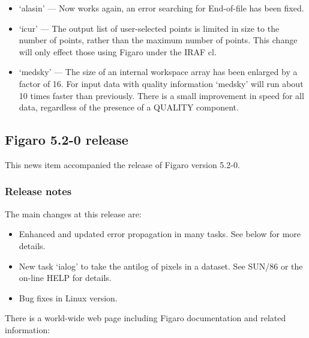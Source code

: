 \documentclass[11pt,twoside]{article}
\begin{document}
\begin{itemize}

\item `alasin' --- Now works again, an error searching for End-of-file
               has been fixed.

\item `icur'   --- The output list of user-selected points is limited in
               size to the number of points, rather than the maximum
               number of points.  This change will only effect those
               using Figaro under the IRAF cl.

\item `medsky' --- The size of an internal workspace array has been
               enlarged by a factor of 16.  For input data with
               quality information `medsky' will run about 10 times
               faster than previously.  There is a small improvement
               in speed for all data, regardless of the presence
               of a QUALITY component.

\end{itemize}


\subsection{\label{news520}Figaro 5.2-0 release}

 This news item accompanied the release of Figaro version 5.2-0.

\subsubsection{\label{news520_release_notes}Release notes}

 The main changes at this release are:

\begin{itemize}
\item Enhanced and updated error propagation in many tasks.  See
    below for more details.
\item New task `ialog' to take the antilog of pixels in a dataset.
    See SUN/86 or the on-line HELP for details.
\item Bug fixes in Linux version.
\end{itemize}

 There is a world-wide web page including Figaro documentation
 and related information:
\end{document}
